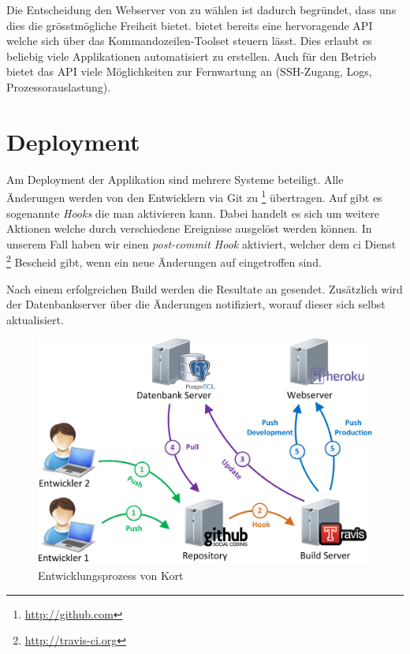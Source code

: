 Die Entscheidung den Webserver von  zu wählen ist dadurch begründet, dass uns dies die grösstmögliche Freiheit bietet. 
 bietet bereits eine hervoragende \gls{API} welche sich über das Kommandozeilen-Toolset  steuern lässt.
Dies erlaubt es beliebig viele Applikationen automatisiert zu erstellen.
Auch für den Betrieb bietet das \gls{API} viele Möglichkeiten zur Fernwartung an (SSH-Zugang, Logs, Prozessorauslastung).

\section{Deployment}
Am Deployment der Applikation sind mehrere Systeme beteiligt. 
Alle Änderungen werden von den Entwicklern via \gls{Git} zu \footnote{\url{http://github.com}} übertragen. 
Auf  gibt es sogenannte \emph{Hooks} die man aktivieren kann. 
Dabei handelt es sich um weitere Aktionen welche durch verschiedene Ereignisse ausgelöst werden können. 
In unserem Fall haben wir einen \emph{post-commit Hook} aktiviert, welcher dem \gls{ci} Dienst \footnote{\url{http://travis-ci.org}} Bescheid gibt, wenn ein neue Änderungen auf  eingetroffen sind.

Nach einem erfolgreichen Build werden die Resultate an  gesendet.
Zusätzlich wird der Datenbankserver über die Änderungen notifiziert, worauf dieser sich selbst aktualisiert.

\begin{figure}[H]
	\centering
	\includegraphics[scale=0.35]{images/implementation/backend/kort-development}
	\caption{Entwicklungsprozess von Kort}
	\label{image-kort-development}
\end{figure}

